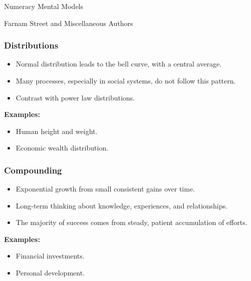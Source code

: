 \begin{frame}[fragile]\frametitle{}
\begin{center}
{\Large Numeracy Mental Models}

{\tiny Farnam Street and Miscellaneous Authors }


\end{center}
\end{frame}

\begin{frame}[fragile]\frametitle{Distributions}
\begin{itemize}
    \item Normal distribution leads to the bell curve, with a central average.
    \item Many processes, especially in social systems, do not follow this pattern.
    \item Contrast with power law distributions.
\end{itemize}
\textbf{Examples:}
\begin{itemize}
    \item Human height and weight.
    \item Economic wealth distribution.
\end{itemize}
\end{frame}

\begin{frame}[fragile]\frametitle{Compounding}
\begin{itemize}
    \item Exponential growth from small consistent gains over time.
    \item Long-term thinking about knowledge, experiences, and relationships.
    \item The majority of success comes from steady, patient accumulation of efforts.
\end{itemize}
\textbf{Examples:}
\begin{itemize}
    \item Financial investments.
    \item Personal development.
\end{itemize}
\end{frame}

